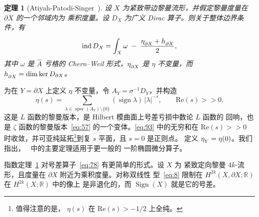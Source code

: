 \documentclass[11pt]{amsart}
\theoremstyle{definition}
\theoremstyle{remark}
\theoremstyle{plain}
\newtheorem{theorem}[equation]{定理}
\numberwithin{equation}{section}
\renewcommand{\:}{\colon}
\newcommand{\Ahat}{{\hat A}}
\newcommand{\RR}{{\mathbb R}}
\DeclareMathOperator{\ind}{ind}
\newcommand{\inv}{^{-1}}
\DeclareRobustCommand{\mstrut}{^{\vphantom{1*\prime y\vee M}}}
\DeclareMathOperator{\Sign}{Sign}
\DeclareMathOperator{\sign}{sign}
\DeclareMathOperator{\spec}{spec}
\newcommand{\bX}{\partial X}
\newcommand{\et}[1]{\eta \mstrut _{#1}}
\renewcommand{\Re}{\text{Re}}
\begin{document}
  \begin{theorem}[Atiyah-Patodi-Singer~\cite{APS1}]\label{thm:16}
 设 $X$ 为紧致带边黎曼流形，并假定黎曼度量在 $\bX$ 的一个邻域内为
乘积度量。设 $D_X$ 为广义 Dirac 算子。则关于整体边界条件，有
  \begin{equation}\label{eq:92}
     \ind D_X = \int_{X}\omega \;-\; \frac{\et{\bX} + h\mstrut _{\bX}}{2}, 
  \end{equation}
其中 $\omega$ 是 $\Ahat$ 亏格的 Chern–Weil 形式，$\et{\bX}$ 是
$\eta$ 不变量，而 $h\mstrut _{\bX}=\dim\ker D_{\bX}$。
  \end{theorem}

\noindent
 为在 $Y=\bX$ 上定义 $\eta$ 不变量，令 $A_Y=\sigma\inv  D_Y$，并构造
  \begin{equation}\label{eq:93}
     \eta (s) = \sum\limits_{\lambda \in \spec(A_Y)\setminus \{0\}}
     (\sign\lambda )\,|\lambda |^{-s},\qquad \Re(s)>\!>0. 
  \end{equation}
这是 $L$ 函数的黎曼版本，是 Hilbert 模曲面上号差亏损中数论 $L$ 函数的
回响，也是 $\zeta$ 函数的黎曼版本~\eqref{eq:57} 的一个变体。\eqref{eq:93}
中的无穷和在 $\Re(s)>\!>0$ 时收敛，并可亚纯延拓\footnote{值得注意的是，
$\eta (s)$ 在 $\Re(s)>-1/2$ 上全纯。}到复 $s$ 平面，且 $s=0$ 是正则点。
定义 $\et Y=\eta (0)$。我们指出，~\cite{APS1} 中的主要定理适用于更一般的
一阶椭圆微分算子。

指数定理~\ref{thm:16} 对号差算子~\eqref{eq:78} 有更简单的形式。设 $X$ 为
紧致定向黎曼 $4k$-流形，且度量在 $\bX$ 附近为乘积度量。对称双线性
型~\eqref{eq:8} 限制在 $H^{2k}(X,\bX;\RR)$ 在 $H^{2k}(X;\RR)$ 中的像上
是非退化的，而 $\Sign(X)$ 就是它的号差。
\end{document}
